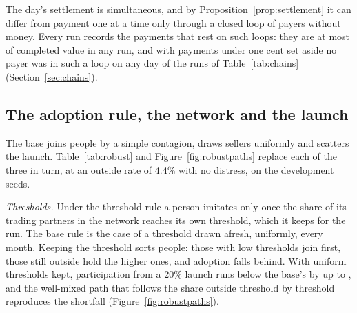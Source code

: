 The day's settlement is simultaneous, and by Proposition~\ref{prop:settlement} it can differ from payment one at a
time only through a closed loop of payers without money. Every run records the payments that rest on such loops:
they are at most \NettingShareMost{} of completed value in any run, and with payments under one cent set aside
no payer was in such a loop on any day of the runs of Table~\ref{tab:chains} (Section~\ref{sec:chains}).

\begin{table}[htbp]\centering\small
\resizebox{\linewidth}{!}{}
\caption{The share of each monthly series' variance about its trend that lies at a period of two months, over the
runs of the development map. The upper rows are the failed share of people not in a job-loss spell, by arrangement,
with the size of the alternation against the series' level and the share of runs on each seed where its sign is
positive.}
\label{tab:periodtwo}
\end{table}

\subsection{The adoption rule, the network and the launch}

The base joins people by a simple contagion, draws sellers uniformly and scatters the launch. Table~\ref{tab:robust}
and Figure~\ref{fig:robustpaths} replace each of the three in turn, at an outside rate of 4.4\% with no distress,
on the development seeds.

\emph{Thresholds.} Under the threshold rule a person imitates only once the share of its trading partners in the
network reaches its own threshold, which it keeps for the run. The base rule is the case of a threshold drawn
afresh, uniformly, every month. Keeping the threshold sorts people: those with low thresholds join first, those
still outside hold the higher ones, and adoption falls behind. With uniform thresholds kept, participation from a
20\% launch runs below the base's by up to \RuleCheckGapMean{}, and the well-mixed path that follows the share
outside threshold by threshold reproduces the shortfall (Figure~\ref{fig:robustpaths}).

